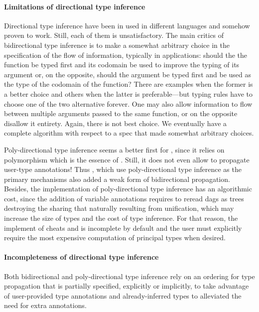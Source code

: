 \documentclass[acmsmall,screen,nonacm]{acmart}
\begin{document}
\paragraph{Limitations of directional type inference}

Directional type inference have been in used in different languages and
somehow proven to work. Still, each of them is unsatisfactory.  The main
critics of bidirectional type inference is to make a somewhat arbitrary
choice in the specification of the flow of information, typically in
applications: should the the function be typed first and its codomain be
used to improve the typing of its argument or, on the opposite, should the
argument be typed first and be used as the type of the codomain of the
function?  There are examples when the former is a better choice and others
when the latter is preferable---but typing rules have to choose one of the
two alternative forever.  One may also allow information to flow between
multiple arguments passed to the same function, or on the opposite disallow
it entirety. Again, there is not best choice. We eventually have a complete
algorithm with respect to a spec that made somewhat arbitrary choices.

Poly-directional type inference seems a better first for \ML, since it
relies on polymorphism which is the essence of \ML. Still, it does not even
allow to propagate user-type annotations! Thus \OCaml, which use
poly-directional type inference as the primary mechanisms also added a weak
form of bidirectional propagation. Besides, the implementation of
poly-directional type inference has an algorithmic cost, since the addition
of variable annotations requires to reread dags as trees destroying the
sharing that naturally resulting from unification, which may increase the
size of types and the cost of type inference. For that reason, the implement
of \OCaml cheats and is incomplete by default and the user must explicitly
require the most expensive computation of principal types when desired.

\paragraph{Incompleteness of directional type inference}

Both bidirectional and poly-directional type inference rely on an ordering
for type propagation that is partially specified, explicitly or implicitly,
to take advantage of user-provided type annotations and already-inferred types
to alleviated the need for extra annotations.
\end{document}
